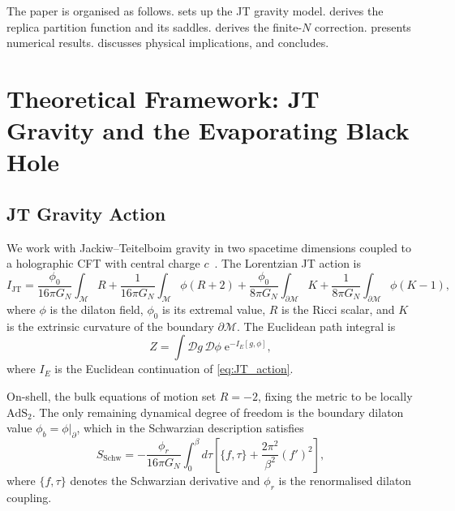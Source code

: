 \documentclass[12pt,a4paper]{article}
\newcommand{\e}{\mathrm{e}}
\newcommand{\Phi}{\phi}  %
\newcommand{\AdS}{\mathrm{AdS}}
\newcommand{\JT}{\mathrm{JT}}
\begin{document}
The paper is organised as follows.   sets up the JT
gravity model.   derives the replica partition function
and its saddles.   derives the finite-$N$ correction.
 presents numerical results.  
discusses physical implications, and  concludes.

\section{Theoretical Framework: JT Gravity and the Evaporating Black Hole}
\label{sec:framework}

\subsection{JT Gravity Action}
\label{subsec:JT_action}

We work with Jackiw--Teitelboim gravity in two spacetime dimensions coupled
to a holographic CFT with central charge $c$~\citep{Jackiw1985,Teitelboim1983,
Almheiri2019b}.  The Lorentzian JT action is
\begin{equation}
  I_{\JT} = \frac{\Phi_0}{16\pi G_N}\!\int_{\mathcal{M}} R
    + \frac{1}{16\pi G_N}\!\int_{\mathcal{M}}\Phi(R+2)
    + \frac{\Phi_0}{8\pi G_N}\!\int_{\partial\mathcal{M}}K
    + \frac{1}{8\pi G_N}\!\int_{\partial\mathcal{M}}\Phi(K-1),
\label{eq:JT_action}
\end{equation}
where $\Phi$ is the dilaton field, $\Phi_0$ is its extremal value,
$R$ is the Ricci scalar, and $K$ is the extrinsic curvature of the
boundary $\partial\mathcal{M}$.  The Euclidean path integral is
\begin{equation}
  Z = \int \mathcal{D}g\,\mathcal{D}\Phi\;\e^{-I_E[g,\Phi]},
\label{eq:path_integral}
\end{equation}
where $I_E$ is the Euclidean continuation of \cref{eq:JT_action}.

On-shell, the bulk equations of motion set $R = -2$, fixing the metric to
be locally $\AdS_2$.  The only remaining dynamical degree of freedom is the
boundary dilaton value $\phi_b = \Phi|_{\partial}$, which in the
Schwarzian description satisfies
\begin{equation}
  S_{\mathrm{Schw}} = -\frac{\phi_r}{16\pi G_N}\!\int_0^\beta\!d\tau
    \left[\{f,\tau\} + \frac{2\pi^2}{\beta^2}(f')^2\right],
\label{eq:schwarzian}
\end{equation}
where $\{f,\tau\}$ denotes the Schwarzian derivative and $\phi_r$ is the
renormalised dilaton coupling.
\end{document}
